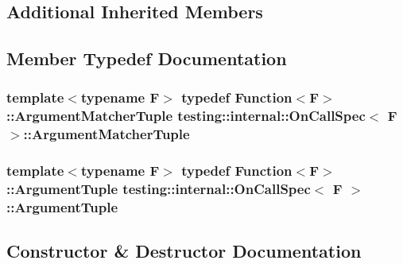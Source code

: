 \subsection*{Additional Inherited Members}


\subsection{Member Typedef Documentation}
\subsubsection[{\texorpdfstring{Argument\+Matcher\+Tuple}{ArgumentMatcherTuple}}]{\setlength{\rightskip}{0pt plus 5cm}template$<$typename F$>$ typedef {\bf Function}$<$F$>$\+::{\bf Argument\+Matcher\+Tuple} {\bf testing\+::internal\+::\+On\+Call\+Spec}$<$ F $>$\+::{\bf Argument\+Matcher\+Tuple}}\hypertarget{classtesting_1_1internal_1_1OnCallSpec_a3240f159f0a9d8cda208bc256da35074}{}\label{classtesting_1_1internal_1_1OnCallSpec_a3240f159f0a9d8cda208bc256da35074}
\subsubsection[{\texorpdfstring{Argument\+Tuple}{ArgumentTuple}}]{\setlength{\rightskip}{0pt plus 5cm}template$<$typename F$>$ typedef {\bf Function}$<$F$>$\+::{\bf Argument\+Tuple} {\bf testing\+::internal\+::\+On\+Call\+Spec}$<$ F $>$\+::{\bf Argument\+Tuple}}\hypertarget{classtesting_1_1internal_1_1OnCallSpec_a70ffab8b915b7b48a90f5ce256da806f}{}\label{classtesting_1_1internal_1_1OnCallSpec_a70ffab8b915b7b48a90f5ce256da806f}


\subsection{Constructor \& Destructor Documentation}

